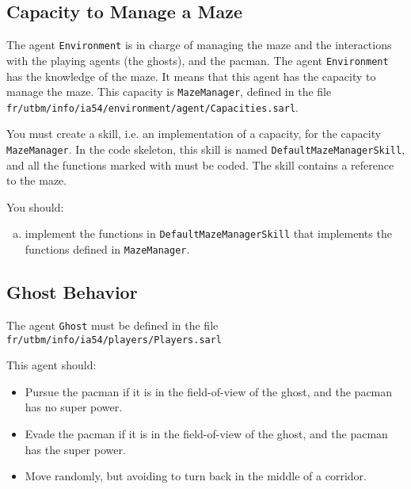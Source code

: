 \documentclass[article,english,nodocumentinfo]{multiagentfrreport}
\begin{document}
\subsection{Capacity to Manage a Maze}

The agent \texttt{Environment} is in charge of managing the maze and the interactions with the playing agents (the ghosts), and the pacman.
The agent \texttt{Environment} has the knowledge of the maze. 
It means that this agent has the capacity to manage the maze.
This capacity is \texttt{MazeManager}, defined in the file \texttt{fr/utbm/info/ia54/environment/agent/Capacities.sarl}.


You must create a skill, i.e. an implementation of a capacity, for the capacity \texttt{MazeManager}.
In the code skeleton, this skill is named \texttt{DefaultMazeManagerSkill}, and all the functions marked with  must be coded.
The skill contains a reference to the maze.

You should:
\begin{enumerate}[a)]
\item implement the functions in \texttt{DefaultMazeManagerSkill} that implements the functions defined in \texttt{MazeManager}.
\end{enumerate}

\subsection{Ghost Behavior}

The agent \texttt{Ghost} must be defined in the file \texttt{fr/utbm/info/ia54/players/Players.sarl}

This agent should:
\begin{itemize}
\item Pursue the pacman if it is in the field-of-view of the ghost, and the pacman has no super power.
\item Evade the pacman if it is in the field-of-view of the ghost, and the pacman has the super power.
\item Move randomly, but avoiding to turn back in the middle of a corridor.
\end{itemize}
\end{document}
